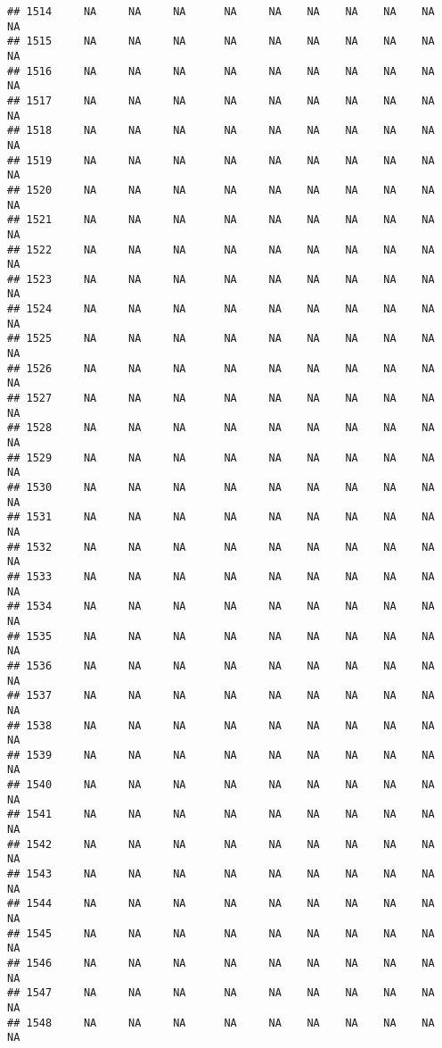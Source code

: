 \documentclass{article}\usepackage{graphicx, color}
\makeatletter
\newenvironment{kframe}{%
 \def\at@end@of@kframe{}%
 \ifinner\ifhmode%
  \def\at@end@of@kframe{\end{minipage}}%
  \begin{minipage}{\columnwidth}%
 \fi\fi%
 \def\FrameCommand##1{\hskip\@totalleftmargin \hskip-\fboxsep
 \colorbox{shadecolor}{##1}\hskip-\fboxsep
     \hskip-\linewidth \hskip-\@totalleftmargin \hskip\columnwidth}%
 \MakeFramed {\advance\hsize-\width
   \@totalleftmargin\z@ \linewidth\hsize
   \@setminipage}}%
 {\par\unskip\endMakeFramed%
 \at@end@of@kframe}
\newenvironment{knitrout}{}{} %
\makeatother
\begin{document}
\begin{knitrout}
\begin{kframe}
\begin{verbatim}
## 1514     NA     NA     NA      NA     NA    NA    NA    NA    NA     NA
## 1515     NA     NA     NA      NA     NA    NA    NA    NA    NA     NA
## 1516     NA     NA     NA      NA     NA    NA    NA    NA    NA     NA
## 1517     NA     NA     NA      NA     NA    NA    NA    NA    NA     NA
## 1518     NA     NA     NA      NA     NA    NA    NA    NA    NA     NA
## 1519     NA     NA     NA      NA     NA    NA    NA    NA    NA     NA
## 1520     NA     NA     NA      NA     NA    NA    NA    NA    NA     NA
## 1521     NA     NA     NA      NA     NA    NA    NA    NA    NA     NA
## 1522     NA     NA     NA      NA     NA    NA    NA    NA    NA     NA
## 1523     NA     NA     NA      NA     NA    NA    NA    NA    NA     NA
## 1524     NA     NA     NA      NA     NA    NA    NA    NA    NA     NA
## 1525     NA     NA     NA      NA     NA    NA    NA    NA    NA     NA
## 1526     NA     NA     NA      NA     NA    NA    NA    NA    NA     NA
## 1527     NA     NA     NA      NA     NA    NA    NA    NA    NA     NA
## 1528     NA     NA     NA      NA     NA    NA    NA    NA    NA     NA
## 1529     NA     NA     NA      NA     NA    NA    NA    NA    NA     NA
## 1530     NA     NA     NA      NA     NA    NA    NA    NA    NA     NA
## 1531     NA     NA     NA      NA     NA    NA    NA    NA    NA     NA
## 1532     NA     NA     NA      NA     NA    NA    NA    NA    NA     NA
## 1533     NA     NA     NA      NA     NA    NA    NA    NA    NA     NA
## 1534     NA     NA     NA      NA     NA    NA    NA    NA    NA     NA
## 1535     NA     NA     NA      NA     NA    NA    NA    NA    NA     NA
## 1536     NA     NA     NA      NA     NA    NA    NA    NA    NA     NA
## 1537     NA     NA     NA      NA     NA    NA    NA    NA    NA     NA
## 1538     NA     NA     NA      NA     NA    NA    NA    NA    NA     NA
## 1539     NA     NA     NA      NA     NA    NA    NA    NA    NA     NA
## 1540     NA     NA     NA      NA     NA    NA    NA    NA    NA     NA
## 1541     NA     NA     NA      NA     NA    NA    NA    NA    NA     NA
## 1542     NA     NA     NA      NA     NA    NA    NA    NA    NA     NA
## 1543     NA     NA     NA      NA     NA    NA    NA    NA    NA     NA
## 1544     NA     NA     NA      NA     NA    NA    NA    NA    NA     NA
## 1545     NA     NA     NA      NA     NA    NA    NA    NA    NA     NA
## 1546     NA     NA     NA      NA     NA    NA    NA    NA    NA     NA
## 1547     NA     NA     NA      NA     NA    NA    NA    NA    NA     NA
## 1548     NA     NA     NA      NA     NA    NA    NA    NA    NA     NA

\end{verbatim}
\end{kframe}
\end{knitrout}
\end{document}
